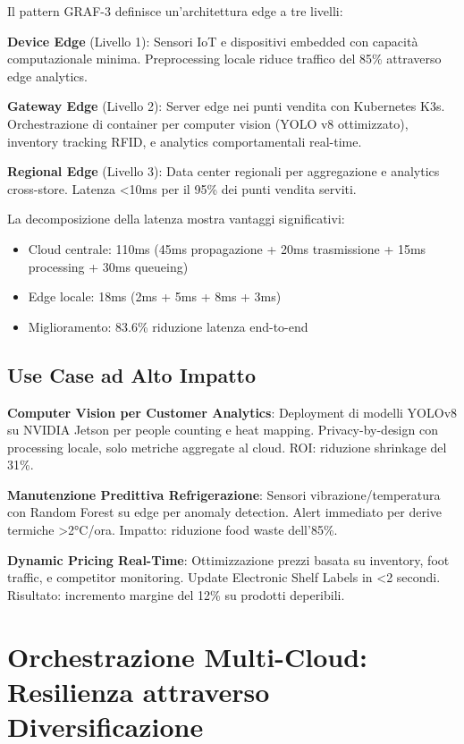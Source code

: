 Il pattern GRAF-3 definisce un'architettura edge a tre livelli:

\textbf{Device Edge} (Livello 1): Sensori IoT e dispositivi embedded con capacità computazionale minima. Preprocessing locale riduce traffico del 85\% attraverso edge analytics.

\textbf{Gateway Edge} (Livello 2): Server edge nei punti vendita con Kubernetes K3s. Orchestrazione di container per computer vision (YOLO v8 ottimizzato), inventory tracking RFID, e analytics comportamentali real-time.

\textbf{Regional Edge} (Livello 3): Data center regionali per aggregazione e analytics cross-store. Latenza <10ms per il 95\% dei punti vendita serviti.

La decomposizione della latenza mostra vantaggi significativi:
\begin{itemize}
\item Cloud centrale: 110ms (45ms propagazione + 20ms trasmissione + 15ms processing + 30ms queueing)
\item Edge locale: 18ms (2ms + 5ms + 8ms + 3ms)
\item Miglioramento: 83.6\% riduzione latenza end-to-end
\end{itemize}

\subsection{\texorpdfstring{Use Case ad Alto Impatto}{3.4.2 - Use Case ad Alto Impatto}}

\textbf{Computer Vision per Customer Analytics}: Deployment di modelli YOLOv8 su NVIDIA Jetson per people counting e heat mapping. Privacy-by-design con processing locale, solo metriche aggregate al cloud. ROI: riduzione shrinkage del 31\%.

\textbf{Manutenzione Predittiva Refrigerazione}: Sensori vibrazione/temperatura con Random Forest su edge per anomaly detection. Alert immediato per derive termiche >2°C/ora. Impatto: riduzione food waste dell'85\%.

\textbf{Dynamic Pricing Real-Time}: Ottimizzazione prezzi basata su inventory, foot traffic, e competitor monitoring. Update Electronic Shelf Labels in <2 secondi. Risultato: incremento margine del 12\% su prodotti deperibili.

\section{\texorpdfstring{Orchestrazione Multi-Cloud: Resilienza attraverso Diversificazione}{3.5 - Orchestrazione Multi-Cloud: Resilienza attraverso Diversificazione}}
\label{sec:multi_cloud}

